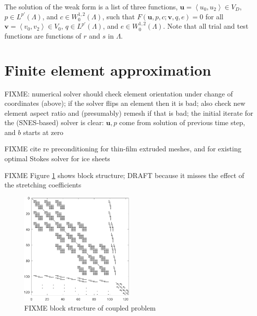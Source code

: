 \documentclass[letterpaper,final,12pt,reqno]{amsart}
\newcommand{\bu}{\mathbf{u}}
\newcommand{\bv}{\mathbf{v}}
\begin{document}
The solution of the weak form is a list of three functions, $\bu = \left<u_0,u_2\right> \in V_D$, $p\in L^{p'}(\Lambda)$, and $c\in W^{1,2}_0(\Lambda)$, such that $F(\bu,p,c;\bv,q,e) = 0$ for all $\bv = \left<v_0,v_2\right> \in V_0$,  $q\in L^{p'}(\Lambda)$, and $e \in W^{1,2}_0(\Lambda)$.  Note that all trial and test functions are functions of $r$ and $s$ in $\Lambda$.


\section{Finite element approximation}  \label{sec:finiteelement}

FIXME: numerical solver should check element orientation under change of coordinates (above); if the solver flips an element then it is bad; also check new element aspect ratio and (presumably) remesh if that is bad; the initial iterate for the (SNES-based) solver is clear: $\bu,p$ come from solution of previous time step, and $b$ starts at zero

FIXME cite \cite{Tuminaroetal2016} re preconditioning for thin-film extruded meshes, and \cite{IsaacStadlerGhattas2015} for existing optimal Stokes solver for ice sheets

FIXME Figure \ref{fig:blockstructure} shows block structure; DRAFT because it misses the effect of the stretching coefficients

\begin{figure}[ht]
\begin{center}
\includegraphics[width=0.5\textwidth]{figs/coarsespy.pdf}
\end{center}
\caption{FIXME block structure of coupled problem}
\label{fig:blockstructure}
\end{figure}
\end{document}
